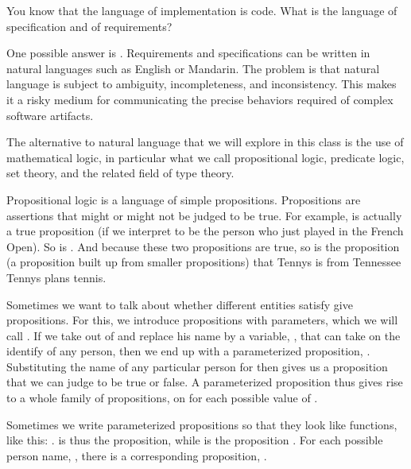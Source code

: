 \documentclass[letterpaper,10pt,english]{sphinxmanual}
\begin{document}
You know that the language of implementation is code. What is the
language of specification and of requirements?

One possible answer is . Requirements and
specifications can be written in natural languages such as English or
Mandarin. The problem is that natural language is subject to
ambiguity, incompleteness, and inconsistency. This makes it a risky
medium for communicating the precise behaviors required of complex
software artifacts.

The alternative to natural language that we will explore in this class
is the use of mathematical logic, in particular what we call propositional
logic, predicate logic, set theory, and the related field of type theory.

Propositional logic is a language of simple propositions. Propositions
are assertions that might or might not be judged to be true. For
example,  is actually a true
proposition (if we interpret  to be the person who just played
in the French Open).  So is . And because
these two propositions are true, so is the  proposition (a
proposition built up from smaller propositions) that Tennys is from
Tennessee  Tennys plans tennis.

Sometimes we want to talk about whether different entities satisfy
give propositions. For this, we introduce propositions with parameters,
which we will call . If we take  out of  and replace his name by a variable, , that can take
on the identify of any person, then we end up with a parameterized
proposition, . Substituting the name of any particular
person for  then gives us a proposition  that we
can judge to be true or false. A parameterized proposition thus gives
rise to a whole family of propositions, on for each possible value of
.

Sometimes we write parameterized propositions so that they look like
functions, like this: .  is thus
the proposition,  while  is
the proposition . For each possible person name,
, there is a corresponding proposition, .
\end{document}
